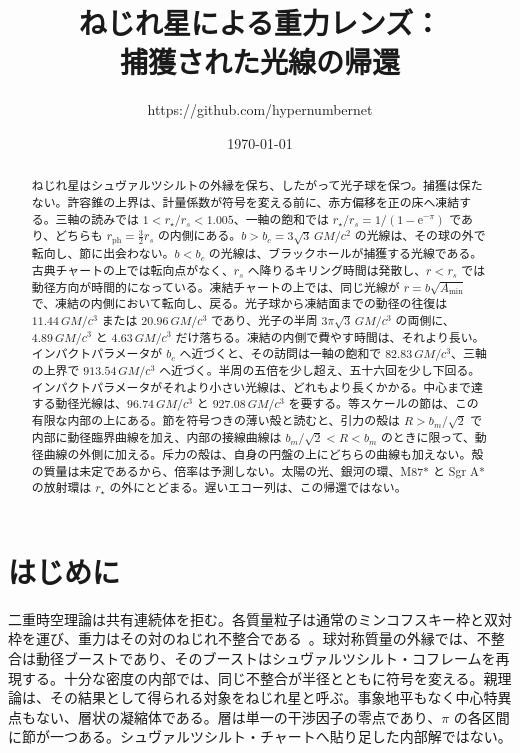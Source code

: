 \documentclass[a4paper]{article}
\title{ねじれ星による重力レンズ：\\
捕獲された光線の帰還}
\author{https://github.com/hypernumbernet}
\date{\today}
\begin{document}
\maketitle

\begin{abstract}
ねじれ星はシュヴァルツシルトの外縁を保ち、したがって光子球を保つ。捕獲は保たない。許容錐の上界は、計量係数が符号を変える前に、赤方偏移を正の床へ凍結する。三軸の読みでは \(1<r_\star/r_s<1.005\)、一軸の飽和では \(r_\star/r_s=1/(1-\mathrm{e}^{-\pi})\) であり、どちらも \(r_{\mathrm{ph}}=\frac32 r_s\) の内側にある。\(b>b_c=3\sqrt{3}\,GM/c^2\) の光線は、その球の外で転向し、節に出会わない。\(b<b_c\) の光線は、ブラックホールが捕獲する光線である。古典チャートの上では転向点がなく、\(r_s\) へ降りるキリング時間は発散し、\(r<r_s\) では動径方向が時間的になっている。凍結チャートの上では、同じ光線が \(r=b\sqrt{A_{\min}}\) で、凍結の内側において転向し、戻る。光子球から凍結面までの動径の往復は \(11.44\,GM/c^3\) または \(20.96\,GM/c^3\) であり、光子の半周 \(3\pi\sqrt{3}\,GM/c^3\) の両側に、\(4.89\,GM/c^3\) と \(4.63\,GM/c^3\) だけ落ちる。凍結の内側で費やす時間は、それより長い。インパクトパラメータが \(b_c\) へ近づくと、その訪問は一軸の飽和で \(82.83\,GM/c^3\)、三軸の上界で \(913.54\,GM/c^3\) へ近づく。半周の五倍を少し超え、五十六回を少し下回る。インパクトパラメータがそれより小さい光線は、どれもより長くかかる。中心まで達する動径光線は、\(96.74\,GM/c^3\) と \(927.08\,GM/c^3\) を要する。等スケールの節は、この有限な内部の上にある。節を符号つきの薄い殻と読むと、引力の殻は \(R>b_m/\sqrt{2}\) で内部に動径臨界曲線を加え、内部の接線曲線は \(b_m/\sqrt{2}<R<b_m\) のときに限って、動径曲線の外側に加える。斥力の殻は、自身の円盤の上にどちらの曲線も加えない。殻の質量は未定であるから、倍率は予測しない。太陽の光、銀河の環、M87* と Sgr A* の放射環は \(r_\star\) の外にとどまる。遅いエコー列は、この帰還ではない。
\end{abstract}

\section{はじめに}
\label{sec:introduction}

二重時空理論は共有連続体を拒む。各質量粒子は通常のミンコフスキー枠と双対枠を運び、重力はその対のねじれ不整合である~\cite{dst-main}。球対称質量の外縁では、不整合は動径ブーストであり、そのブーストはシュヴァルツシルト・コフレームを再現する。十分な密度の内部では、同じ不整合が半径とともに符号を変える。親理論は、その結果として得られる対象をねじれ星と呼ぶ。事象地平もなく中心特異点もない、層状の凝縮体である。層は単一の干渉因子の零点であり、\(\pi\) の各区間に節が一つある。シュヴァルツシルト・チャートへ貼り足した内部解ではない。
\end{document}
